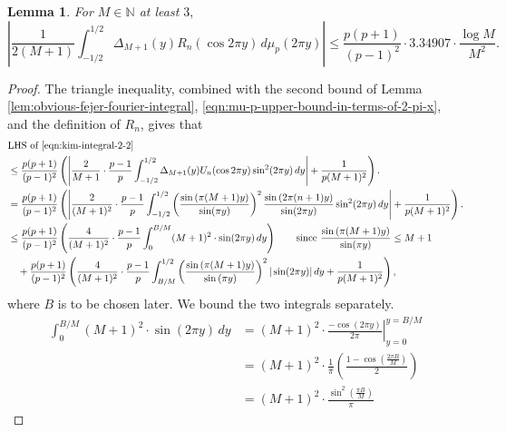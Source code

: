 \documentclass[11pt,letterpaper,reqno]{amsart}
\newtheorem{lemma}[theorem]{Lemma}
\theoremstyle{definition}
\numberwithin{equation}{section}
\numberwithin{figure}{section}
\numberwithin{table}{section}
\begin{document}
\begin{lemma} \label{lem:kim-integral-2.2}
    For $M \in \mathbb{N}$ at least $3,$
    \begin{equation}
        \left| \frac{1}{2(M + 1)} \int_{-1/2}^{1/2}
 \Delta_{M+1}(y) R_n ( \cos 2 \pi y ) \,d\mu_p(2\pi y) \right| \leq \frac{p(p + 1)}{(p - 1)^2} \cdot 3.34907 \cdot \frac{\log M}{M^2}. \label{eqn:kim-integral-2-2}
    \end{equation}
\end{lemma}
\begin{proof}
    The triangle inequality, combined with the second bound of Lemma \ref{lem:obvious-fejer-fourier-integral}, \eqref{eqn:mu-p-upper-bound-in-terms-of-2-pi-x}, and the definition of $R_n$, gives that
    \begin{align}
        &\text{LHS of \eqref{eqn:kim-integral-2-2}} \\
        &\leq \frac{p(p + 1)}{(p - 1)^2}\left( \left| \frac{2}{M + 1} \cdot \frac{p - 1}{p} \int_{-1/2}^{1/2}
        \Delta_{M+1}(y) U_n ( \cos 2 \pi y ) \sin^2(2\pi y) \, dy \right| + \frac{1}{p(M + 1)^2} \right).\\
        &= \frac{p(p + 1)}{(p - 1)^2}\left( \left| \frac{2}{(M + 1)^2} \cdot \frac{p - 1}{p} \int_{-1/2}^{1/2}
        \left( \frac{\sin \left( \pi (M + 1) y \right)}{\sin(\pi y)}  \right)^2 \frac{\sin \left( 2\pi (n + 1) y  \right)}{\sin (2\pi y)} \sin^2(2\pi y) \, dy \right| + \frac{1}{p(M + 1)^2} \right).\\
        &\leq \frac{p(p + 1)}{(p - 1)^2}\left(  \frac{4}{(M + 1)^2} \cdot \frac{p - 1}{p} \int_{0}^{B/M} (M + 1)^2 \cdot \sin(2\pi y) \, dy \right) \qquad \text{since $\frac{\sin \left( \pi (M + 1) y \right)}{\sin(\pi y)} \leq M + 1$} \\
        & \quad + \frac{p(p + 1)}{(p - 1)^2}\left(  \frac{4}{(M + 1)^2} \cdot \frac{p - 1}{p} \int_{B/M}^{1/2} \left( \frac{\sin \left( \pi (M + 1) y \right)}{\sin \left( \pi y \right)} \right)^2  |\sin(2\pi y )|  \, dy + \frac{1}{p(M + 1)^2} \right),
    \end{align}
    where $B$ is to be chosen later. We bound the two integrals separately.
    \begin{align}
        \int_{0}^{B/M} (M + 1)^2 \cdot \sin(2\pi y) \, dy &= (M + 1)^2 \cdot \left. \frac{- \cos(2\pi y)}{2\pi } \right|_{y = 0}^{y = B/M}\\
        &= (M + 1)^2 \cdot \frac{1}{\pi}\left( \frac{1 -  \cos\left( \frac{2\pi B }{M}  \right)}{2} \right)\\
        &= (M + 1)^2 \cdot \frac{\sin^2 \! \left( \frac{\pi B}{M} \right)}{\pi} \label{eqn:kim-2.2-1}

\end{align}
\end{proof}
\end{document}
